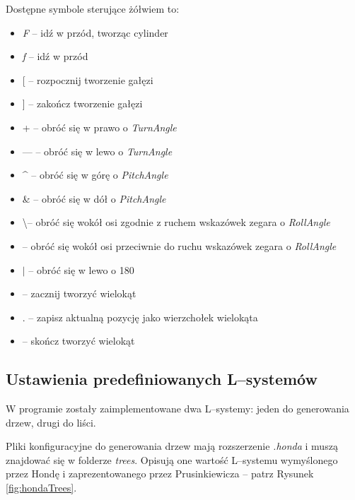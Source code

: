 \documentclass[inz,shortabstract]{iithesis}
\begin{document}
        Dostępne symbole sterujące żółwiem to:
        \begin{itemize}
            \item \textit{F} -- idź w przód, tworząc cylinder
            \item \textit{f} -- idź w przód
            \item {[} -- rozpocznij tworzenie gałęzi
            \item {]} -- zakończ tworzenie gałęzi
            \item + -- obróć się w prawo o \textit{TurnAngle}
            \item --- -- obróć się w lewo o \textit{TurnAngle}
            \item \^{} -- obróć się w górę o \textit{PitchAngle}
            \item \& -- obróć się w dół o \textit{PitchAngle}
            \item \textbackslash -- obróć się wokół osi zgodnie z ruchem wskazówek zegara o \textit{RollAngle}
            \item \text{/} -- obróć się wokół osi przeciwnie do ruchu wskazówek zegara o \textit{RollAngle}
            \item $|$ -- obróć się w lewo o 180\degree
            \item \textbraceleft -- zacznij tworzyć wielokąt
            \item . -- zapisz aktualną pozycję jako wierzchołek wielokąta
            \item \textbraceright -- skończ tworzyć wielokąt
        \end{itemize}
        
        \subsection{Ustawienia predefiniowanych L--systemów}
        W programie zostały zaimplementowane dwa L--systemy: jeden do generowania drzew, drugi do liści.
        
        Pliki konfiguracyjne do generowania drzew mają rozszerzenie \textit{.honda} i muszą znajdować się w folderze \textit{trees}. Opisują one wartość L--systemu wymyślonego przez Hondę \cite{honda} i zaprezentowanego przez Prusinkiewicza \cite{plants} -- patrz Rysunek \ref{fig:hondaTrees}.
        
\end{document}
